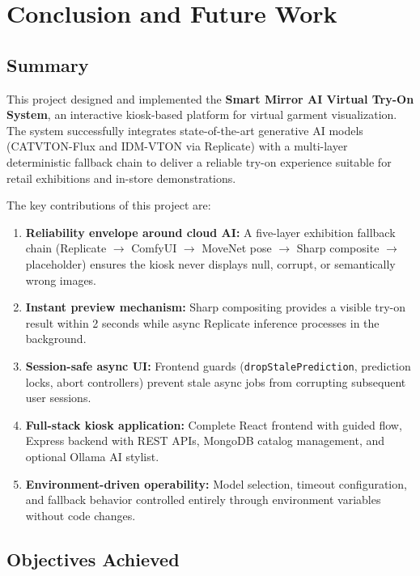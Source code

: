 \chapter{Conclusion and Future Work}
\label{ch:conclusion}

\section{Summary}
\label{sec:summary}

This project designed and implemented the \textbf{Smart Mirror AI Virtual Try-On System}, an interactive kiosk-based platform for virtual garment visualization. The system successfully integrates state-of-the-art generative AI models (CATVTON-Flux and IDM-VTON via Replicate) with a multi-layer deterministic fallback chain to deliver a reliable try-on experience suitable for retail exhibitions and in-store demonstrations.

The key contributions of this project are:

\begin{enumerate}[leftmargin=*]
  \item \textbf{Reliability envelope around cloud AI:} A five-layer exhibition fallback chain (Replicate $\rightarrow$ ComfyUI $\rightarrow$ MoveNet pose $\rightarrow$ Sharp composite $\rightarrow$ placeholder) ensures the kiosk never displays null, corrupt, or semantically wrong images.
  \item \textbf{Instant preview mechanism:} Sharp compositing provides a visible try-on result within 2 seconds while async Replicate inference processes in the background.
  \item \textbf{Session-safe async UI:} Frontend guards (\texttt{dropStalePrediction}, prediction locks, abort controllers) prevent stale async jobs from corrupting subsequent user sessions.
  \item \textbf{Full-stack kiosk application:} Complete React frontend with guided flow, Express backend with REST APIs, MongoDB catalog management, and optional Ollama AI stylist.
  \item \textbf{Environment-driven operability:} Model selection, timeout configuration, and fallback behavior controlled entirely through environment variables without code changes.
\end{enumerate}

\section{Objectives Achieved}
\label{sec:objectives-achieved}

